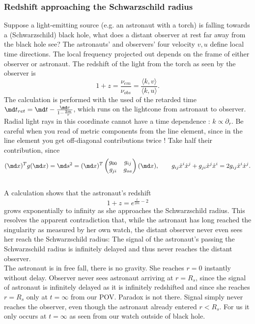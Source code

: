 \subsubsection{Redshift approaching the Schwarzschild radius}
Suppose a light-emitting source (e.g. an astronaut with a torch) is falling
towards a (Schwarzschild) black hole, what does a distant observer at rest far away from the black hole see?
The astronauts' and observers' four velocity $v,u$ define local time directions. The local frequency projected out depends on the frame of either observer or astronaut. The redshift of the light from the
torch as seen by the observer is
\begin{equation}
	1+z = \frac{\nu_{em}}{\nu_{obs}} = \frac{\langle k,v\rangle}{\langle k,u\rangle}.
\end{equation}
The calculation is performed with the used of the retarded time $\md t_{ret} = \md t - \frac{\md r}{1-\frac{2m}{r}}$, which runs on the lightcone from astronaut to observer. Radial light rays in this coordinate cannot have a time dependence : $k \propto \partial_r$. Be careful when you read of metric components from the line element, since in the line element you get off-diagonal contributions twice ! Take half their contribution, since 
\begin{equation*}
	(\md x)^T g(\md x) = \md s^2 = (\md x)^T \begin{pmatrix}
	g_{00} &g_{ij}\\
	g_{ji} & g_{aa} \\
	\end{pmatrix}
	(\md x),
	\qquad g_{ij} \dot{x}^i \dot{x}^j + g_{ji} \dot{x}^j \dot{x}^i=2 g_{ij} \dot{x}^i \dot{x}^j.
\end{equation*}
\\
A calculation shows that the astronaut’s redshift
\begin{equation}
	1+z = e^{\frac{t}{2m} -2}
\end{equation}
grows exponentially to infinity as she approaches the Schwarzschild radius. This resolves the apparent contradiction that, while the astronaut has
long reached the singularity as measured by her own watch, the distant
observer never even sees her reach the Schwarzschild radius: The signal
of the astronaut’s passing the Schwarzschild radius is infinitely delayed
and thus never reaches the distant observer.\\
The astronaut is in free fall, there is no gravity. She reaches $r=0$ instantly without delay. Observer never sees astronaut arriving at $r=R_s$, since the signal of astronaut is infinitely delayed as it is infinitely redshifted and since she reaches $r=R_s$ only at $t= \infty$ from our POV.
Paradox is not there. Signal simply never reaches the observer, even though the astronaut already entered $r< R_s$. For us it only occurs at $t=\infty$ as seen from our watch outside of black hole.
